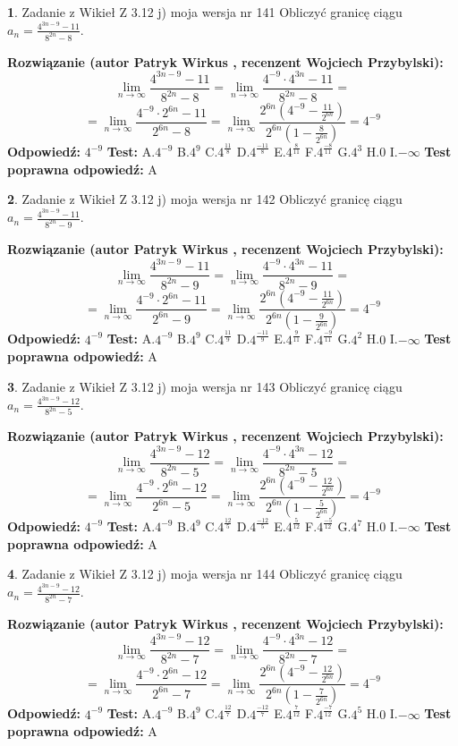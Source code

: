 \documentclass[12pt, a4paper]{article}
\theoremstyle{definition} %
\newtheorem{zad}{}
\newcommand{\zadStart}[1]{\begin{zad}#1\newline}
\newcommand{\zadStop}{\end{zad}}
\newcommand{\rozwStart}[2]{\noindent \textbf{Rozwiązanie (autor #1 , recenzent #2): }\newline}
\newcommand{\rozwStop}{\newline}
\newcommand{\odpStart}{\noindent \textbf{Odpowiedź:}\newline}
\newcommand{\odpStop}{\newline}
\newcommand{\testStart}{\noindent \textbf{Test:}\newline}
\newcommand{\testStop}{\newline}
\newcommand{\kluczStart}{\noindent \textbf{Test poprawna odpowiedź:}\newline}
\newcommand{\kluczStop}{\newline}
\begin{document}
\zadStart{Zadanie z Wikieł Z 3.12 j) moja wersja nr 141}
Obliczyć granicę ciągu $a_{n}=\frac{4^{3n-9}-11}{8^{2n}-8}$.
\zadStop
\rozwStart{Patryk Wirkus}{Wojciech Przybylski}
$$\lim\limits_{n\to\infty}\frac{4^{3n-9}-11}{8^{2n}-8}= \lim\limits_{n\to\infty}\frac{4^{-9} \cdot 4^{3n}-11}{8^{2n}-8}=$$
$$= \lim\limits_{n\to\infty}\frac{4^{-9} \cdot 2^{6n}-11}{2^{6n}-8}= \lim\limits_{n\to\infty}\frac{2^{6n}(4^{-9} - \frac{11}{2^{6n}})}{2^{6n}(1-\frac{8}{2^{6n}})}= 4^{-9}$$
\rozwStop
\odpStart
$4^{-9}$
\odpStop
\testStart
A.$4^{-9}$
B.$4^{9}$
C.$4^{\frac{11}{8}}$
D.$4^{\frac{-11}{8}}$
E.$4^{\frac{8}{11}}$
F.$4^{\frac{-8}{11}}$
G.$4^{3}$
H.$0$
I.$-\infty$
\testStop
\kluczStart
A
\kluczStop



\zadStart{Zadanie z Wikieł Z 3.12 j) moja wersja nr 142}
Obliczyć granicę ciągu $a_{n}=\frac{4^{3n-9}-11}{8^{2n}-9}$.
\zadStop
\rozwStart{Patryk Wirkus}{Wojciech Przybylski}
$$\lim\limits_{n\to\infty}\frac{4^{3n-9}-11}{8^{2n}-9}= \lim\limits_{n\to\infty}\frac{4^{-9} \cdot 4^{3n}-11}{8^{2n}-9}=$$
$$= \lim\limits_{n\to\infty}\frac{4^{-9} \cdot 2^{6n}-11}{2^{6n}-9}= \lim\limits_{n\to\infty}\frac{2^{6n}(4^{-9} - \frac{11}{2^{6n}})}{2^{6n}(1-\frac{9}{2^{6n}})}= 4^{-9}$$
\rozwStop
\odpStart
$4^{-9}$
\odpStop
\testStart
A.$4^{-9}$
B.$4^{9}$
C.$4^{\frac{11}{9}}$
D.$4^{\frac{-11}{9}}$
E.$4^{\frac{9}{11}}$
F.$4^{\frac{-9}{11}}$
G.$4^{2}$
H.$0$
I.$-\infty$
\testStop
\kluczStart
A
\kluczStop



\zadStart{Zadanie z Wikieł Z 3.12 j) moja wersja nr 143}
Obliczyć granicę ciągu $a_{n}=\frac{4^{3n-9}-12}{8^{2n}-5}$.
\zadStop
\rozwStart{Patryk Wirkus}{Wojciech Przybylski}
$$\lim\limits_{n\to\infty}\frac{4^{3n-9}-12}{8^{2n}-5}= \lim\limits_{n\to\infty}\frac{4^{-9} \cdot 4^{3n}-12}{8^{2n}-5}=$$
$$= \lim\limits_{n\to\infty}\frac{4^{-9} \cdot 2^{6n}-12}{2^{6n}-5}= \lim\limits_{n\to\infty}\frac{2^{6n}(4^{-9} - \frac{12}{2^{6n}})}{2^{6n}(1-\frac{5}{2^{6n}})}= 4^{-9}$$
\rozwStop
\odpStart
$4^{-9}$
\odpStop
\testStart
A.$4^{-9}$
B.$4^{9}$
C.$4^{\frac{12}{5}}$
D.$4^{\frac{-12}{5}}$
E.$4^{\frac{5}{12}}$
F.$4^{\frac{-5}{12}}$
G.$4^{7}$
H.$0$
I.$-\infty$
\testStop
\kluczStart
A
\kluczStop



\zadStart{Zadanie z Wikieł Z 3.12 j) moja wersja nr 144}
Obliczyć granicę ciągu $a_{n}=\frac{4^{3n-9}-12}{8^{2n}-7}$.
\zadStop
\rozwStart{Patryk Wirkus}{Wojciech Przybylski}
$$\lim\limits_{n\to\infty}\frac{4^{3n-9}-12}{8^{2n}-7}= \lim\limits_{n\to\infty}\frac{4^{-9} \cdot 4^{3n}-12}{8^{2n}-7}=$$
$$= \lim\limits_{n\to\infty}\frac{4^{-9} \cdot 2^{6n}-12}{2^{6n}-7}= \lim\limits_{n\to\infty}\frac{2^{6n}(4^{-9} - \frac{12}{2^{6n}})}{2^{6n}(1-\frac{7}{2^{6n}})}= 4^{-9}$$
\rozwStop
\odpStart
$4^{-9}$
\odpStop
\testStart
A.$4^{-9}$
B.$4^{9}$
C.$4^{\frac{12}{7}}$
D.$4^{\frac{-12}{7}}$
E.$4^{\frac{7}{12}}$
F.$4^{\frac{-7}{12}}$
G.$4^{5}$
H.$0$
I.$-\infty$
\testStop
\kluczStart
A
\kluczStop
\end{document}
